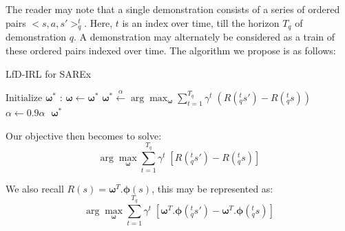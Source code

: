 The reader may note that a single demonstration consists of a series of ordered pairs ${<}s,a,s'{>}_q^t$. Here, $t$ is an index over time, till the horizon $T_q$ of demonstration $q$. A demonstration may alternately be considered as a train of these ordered pairs indexed over time. The algorithm we propose is as follows: 


\begin{algorithm}
	\caption{LfD-IRL for SAREx}
	\begin{algorithmic}[1]
		\State $\text{Initialize }\bm{\omega}^*$ 
		:
		\State $\bm{\omega} \leftarrow \bm{\omega}^*$
		\State $\bm{\omega}^* \xleftarrow{\alpha} \arg\max_{\bm{\omega}} \sum_{t=1}^{T_q} \gamma^t \; ( R(_q^ts') - R(_q^ts) ) $
		\State $\alpha \leftarrow 0.9 \alpha$
		\EndFor
		\State \Return $\; \bm{\omega}^*$
		\EndProcedure
	\end{algorithmic}
\end{algorithm}



Our objective then becomes to solve: 
\begin{equation}
\arg\max_{\bm{\omega}} \sum_{t=1}^{T_q} \gamma^t \; [ R(_q^ts') - R(_q^ts) ]
\end{equation}


We also recall $R(s) = \bm{\omega}^T . \bm{\phi}(s)$, this may be represented as: 
\begin{equation}
\arg\max_{\bm{\omega}} \sum_{t=1}^{T_q} \gamma^t \; [ \bm{\omega}^T.\bm{\phi}(_q^ts') - \bm{\omega}^T.\bm{\phi}(_q^ts) ]
\end{equation}


